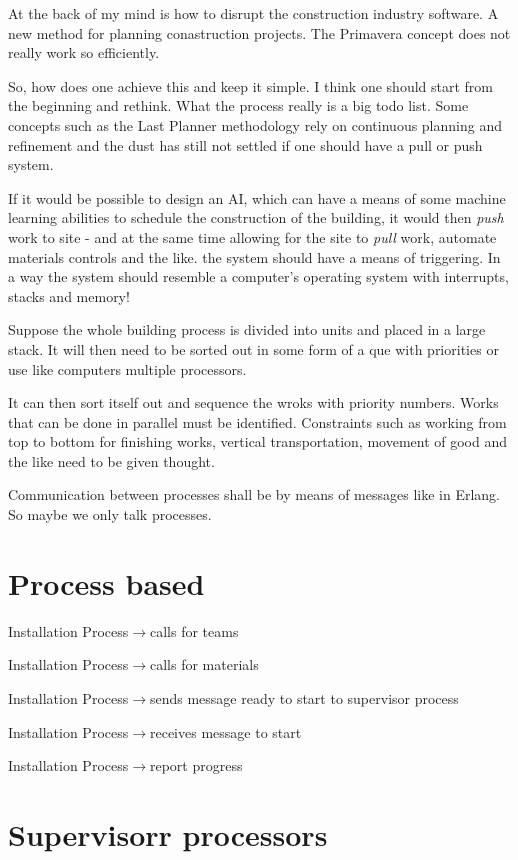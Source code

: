 At the back of my mind is how to disrupt the construction industry software. A new method for planning conastruction projects. The Primavera concept does not really work so efficiently.

So, how does one achieve this and keep it simple. I think one should start from the beginning and rethink. What the process really is a big todo list. Some concepts such as the Last Planner methodology rely on continuous planning and refinement and the dust has still not settled if one should have a pull or push system.

If it would be possible to design an AI, which can have a means of some machine learning abilities to schedule the construction of the building, it would then \textit{push} work to site - and at the same time allowing for the site to \textit{pull} work, automate materials controls and the like.
the system should have a means of triggering. In a way the system should resemble a computer's operating system with interrupts, stacks and memory! 

Suppose the whole building process is divided into units and placed in a large stack.
It will then need to be sorted out in some form of a que with priorities or use like computers multiple processors.

It can then sort itself out and sequence the wroks with priority numbers. Works that can be done in parallel must be identified. Constraints such as working from top to bottom for finishing works, vertical transportation, movement of good and the like need to be given thought.

Communication between processes shall be by means of messages like in Erlang. So maybe we only talk processes.


\section*{Process based}

Installation Process$\rightarrow$calls for teams

Installation Process$\rightarrow$calls for materials

Installation Process$\rightarrow$sends message ready to start to supervisor process

Installation Process$\rightarrow$receives message to start

Installation Process$\rightarrow$report progress


\section*{Supervisorr processors}

